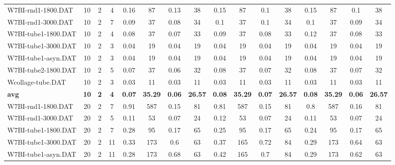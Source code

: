 \begin{sidewaystable}[!ht]
{\begin{tabular}{lccccccccccccccc}
W7BI-rnd1-1800.DAT & 10 & 2 & 4 & 0.16 & 87 & 0.13 & 38 & 0.15 & 87 &  \textcolor{blue2}{0.1} & 38 & 0.15 & 87 &  \textcolor{blue2}{0.1} & 38 \\
W7BI-rnd1-3000.DAT & 10 & 2 & 7 & 0.09 & 37 &  \textcolor{blue2}{0.08} & 34 & 0.1 & 37 & 0.1 & 34 & 0.1 & 37 & 0.09 & 34 \\
W7BI-tube1-1800.DAT & 10 & 2 & 4 & 0.08 & 37 &  \textcolor{blue2}{0.07} & 33 & 0.09 & 37 & 0.08 & 33 & 0.12 & 37 & 0.08 & 33 \\
W7BI-tube1-3000.DAT & 10 & 2 & 3 &  \textcolor{blue2}{0.04} & 19 &  \textcolor{blue2}{0.04} & 19 &  \textcolor{blue2}{0.04} & 19 &  \textcolor{blue2}{0.04} & 19 &  \textcolor{blue2}{0.04} & 19 &  \textcolor{blue2}{0.04} & 19 \\
W7BI-tube1-asyn.DAT & 10 & 2 & 3 &  \textcolor{blue2}{0.04} & 19 &  \textcolor{blue2}{0.04} & 19 &  \textcolor{blue2}{0.04} & 19 &  \textcolor{blue2}{0.04} & 19 &  \textcolor{blue2}{0.04} & 19 &  \textcolor{blue2}{0.04} & 19 \\
W7BI-tube2-1800.DAT & 10 & 2 & 5 & 0.07 & 37 &  \textcolor{blue2}{0.06} & 32 & 0.08 & 37 & 0.07 & 32 & 0.08 & 37 & 0.07 & 32 \\
Wcollage-tube.DAT & 10 & 2 & 3 &  \textcolor{blue2}{0.03} & 11 &  \textcolor{blue2}{0.03} & 11 &  \textcolor{blue2}{0.03} & 11 &  \textcolor{blue2}{0.03} & 11 &  \textcolor{blue2}{0.03} & 11 &  \textcolor{blue2}{0.03} & 11 \\
\cline{1-16} \textbf{avg} & \textbf{10} & \textbf{2} & \textbf{4} & \textbf{0.07} & \textbf{35.29} & \textbf{0.06} & \textbf{26.57} & \textbf{0.08} & \textbf{35.29} & \textbf{0.07} & \textbf{26.57} & \textbf{0.08} & \textbf{35.29} & \textbf{0.06} & \textbf{26.57} \\ \cline{1-16}
W7BI-rnd1-1800.DAT & 20 & 2 & 7 & 0.91 & 587 &  \textcolor{blue2}{0.15} & 81 & 0.81 & 587 &  \textcolor{blue2}{0.15} & 81 & 0.8 & 587 & 0.16 & 81 \\
W7BI-rnd1-3000.DAT & 20 & 2 & 5 & 0.11 & 53 &  \textcolor{blue2}{0.07} & 24 & 0.12 & 53 &  \textcolor{blue2}{0.07} & 24 & 0.11 & 53 &  \textcolor{blue2}{0.07} & 24 \\
W7BI-tube1-1800.DAT & 20 & 2 & 7 & 0.28 & 95 &  \textcolor{blue2}{0.17} & 65 & 0.25 & 95 &  \textcolor{blue2}{0.17} & 65 & 0.24 & 95 &  \textcolor{blue2}{0.17} & 65 \\
W7BI-tube1-3000.DAT & 20 & 2 & 11 & 0.33 & 173 & 0.6 & 63 & 0.37 & 165 & 0.72 & 84 &  \textcolor{blue2}{0.29} & 173 & 0.64 & 63 \\
W7BI-tube1-asyn.DAT & 20 & 2 & 11 &  \textcolor{blue2}{0.28} & 173 & 0.68 & 63 & 0.42 & 165 & 0.7 & 84 & 0.29 & 173 & 0.62 & 63 \\

\end{tabular}}
\end{sidewaystable}
